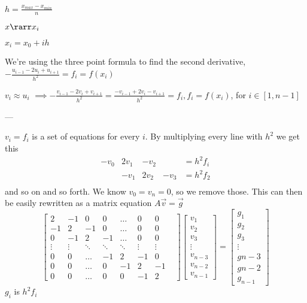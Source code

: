 \documentclass[english,notitlepage]{revtex4-1}  %
\begin{document}
$h = \frac{x_{max} - x_{min}}{n} $

$ x \rarr x_i$

$x_i = x_0 + ih$

We're using the three point formula to find the second derivative, $-\frac{u_{i-1} -2 u_i + u_{i+1}}{h^2} = f_i = f(x_i)$ 

$v_i \approx u_i$ $\implies -\frac{v_{i-1} -2 v_i + v_{i+1}}{h^2} = \frac{-v_{i-1} + 2 v_i - v_{i+1}}{h^2} = f_i, f_i = f(x_i)$, for $i \in [1, n-1]$



---



$v_i = f_i$ is a set of equations for every $i$. By multiplying every line with $h^2$ we get this
$$
\begin{matrix}
	-v_0 & 2v_1 & -v_2  &           & = h^2f_i \\
	& -v_1 &  2v_2 & - v_3 & = h^2f_2 \\
\end{matrix}
$$
and so on and so forth. We know $v_0 = v_n = 0$, so we remove those. This can then be easily rewritten as a matrix equation $A\vec{v} = \vec{g}$
$$
\begin{bmatrix}
	2  & -1 & 0  & 0  & \dots & 0 & 0 & \\
	-1 &  2 & -1 & 0  & \dots & 0 & 0 \\
	0  & -1 & 2  & -1 & \dots & 0 & 0 \\
	\vdots & \vdots & \ddots & \ddots & \ddots & \vdots & \vdots \\
	0 & 0 & \dots &-1 & 2 & -1 & 0 \\
	0 & 0 & \dots & 0 & -1 & 2  & -1 \\
	0 & 0 & \dots & 0 & 0 & -1 & 2
	
\end{bmatrix}
\begin{bmatrix}
	v_1 \\ v_2 \\ v_3 \\ \vdots \\ v_{n-3} \\v_{n-2} \\ v_{n-1}
\end{bmatrix}
=
\begin{bmatrix}
	g_1 \\ g_2 \\ g_3 \\ \vdots \\ g{n-3} \\ g{n-2} \\ g_{n-1}
\end{bmatrix}
$$
$g_i$ is $h^2f_i $
\end{document}

